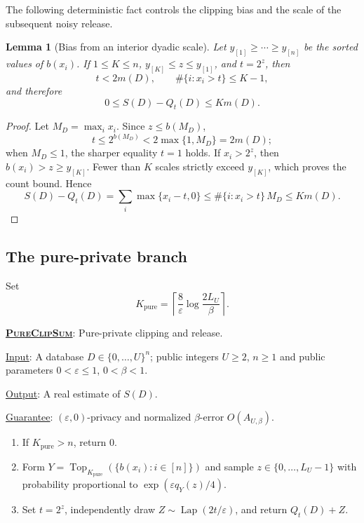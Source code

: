 \documentclass[11pt]{article}
\newenvironment{fminipage}%
  {\begin{Sbox}\begin{minipage}}%
  {\end{minipage}\end{Sbox}\fbox{\TheSbox}}
\newenvironment{algbox}[0]{%
\vskip 0.2in
\noindent
\begin{fminipage}{6.3in}
}{%
\end{fminipage}
\vskip 0.2in
}
\newtheorem{lemma}{Lemma}[section]
\begin{document}
The following deterministic fact controls the clipping bias and the scale
of the subsequent noisy release.

\begin{lemma}[Bias from an interior dyadic scale]
\label{lem:dyadic-clipping}
Let $y_{[1]}\ge\cdots\ge y_{[n]}$ be the sorted values of $b(x_i)$.  If
$1\le K\le n$, $y_{[K]}\le z\le y_{[1]}$, and $t=2^z$, then
\[
 t<2m(D),
 \qquad
 \#\{i:x_i>t\}\le K-1,
\]
and therefore
\begin{equation}
 0\le S(D)-Q_t(D)\le K m(D).
 \label{eq:clipping-bias}
\end{equation}
\end{lemma}

\begin{proof}
Let $M_D=\max_i x_i$.  Since $z\le b(M_D)$,
\[
 t\le2^{b(M_D)}<2\max\{1,M_D\}=2m(D);
\]
when $M_D\le1$, the sharper equality $t=1$ holds.  If $x_i>2^z$, then
$b(x_i)>z\ge y_{[K]}$.  Fewer than $K$ scales strictly exceed
$y_{[K]}$, which proves the count bound.  Hence
\[
 S(D)-Q_t(D)
 =\sum_i\max\{x_i-t,0\}
 \le \#\{i:x_i>t\}\,M_D
 \le K m(D).
\]
\end{proof}

\subsection{The pure-private branch}

Set
\begin{equation}
 K_{\mathrm{pure}}
 =\left\lceil\frac8\varepsilon\log\frac{2L_U}{\beta}\right\rceil.
 \label{eq:pure-k}
\end{equation}

\begin{algbox}
\textbf{\uline{\textsc{PureClipSum}}}: Pure-private clipping and release.
\label{alg:pure-clip-sum}

\uline{Input}: A database $D\in\{0,\ldots,U\}^n$; public integers
$U\ge2$, $n\ge1$ and public parameters $0<\varepsilon\le1$,
$0<\beta<1$.

\uline{Output}: A real estimate of $S(D)$.

\uline{Guarantee}: $(\varepsilon,0)$-privacy and normalized
$\beta$-error $O(A_{U,\beta})$.

\begin{enumerate}[leftmargin=*,nosep]
  \item If $K_{\mathrm{pure}}>n$, return $0$.
  \item Form
  $Y=\operatorname{Top}_{K_{\mathrm{pure}}}
  (\{b(x_i):i\in[n]\})$ and sample $z\in\{0,\ldots,L_U-1\}$ with
  probability proportional to $\exp(\varepsilon q_Y(z)/4)$.
  \item Set $t=2^z$, independently draw
  $Z\sim\operatorname{Lap}(2t/\varepsilon)$, and return $Q_t(D)+Z$.
\end{enumerate}
\end{algbox}
\end{document}
